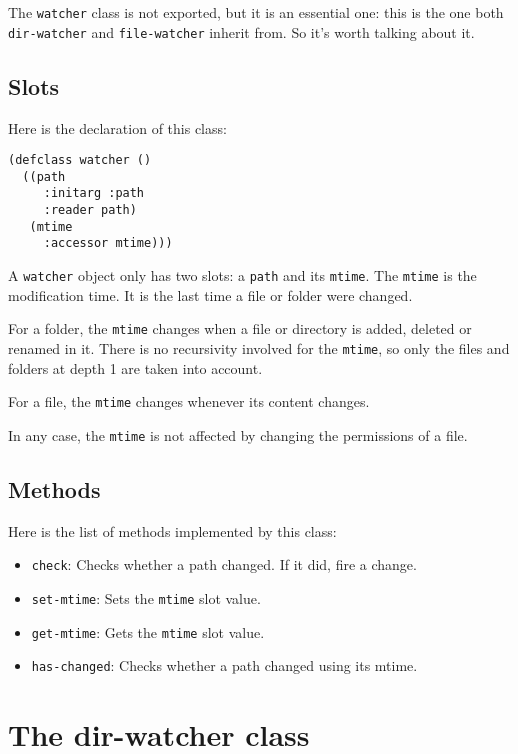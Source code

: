 \documentclass[a4paper]{report}
\newcommand{\code}{\texttt}
\begin{document}
The \code{watcher} class is not exported, but it is an essential one: this is
the one both \code{dir-watcher} and \code{file-watcher} inherit from. So it's
worth talking about it.

\subsection{Slots}

Here is the declaration of this class:

\begin{verbatim}
(defclass watcher ()
  ((path
     :initarg :path
     :reader path)
   (mtime
     :accessor mtime)))
\end{verbatim}

A \code{watcher} object only has two slots: a \code{path} and its \code{mtime}.
The \code{mtime} is the modification time. It is the last time a file or folder
were changed.

For a folder, the \code{mtime} changes when a file or directory is added,
deleted or renamed in it. There is no recursivity involved for the \code{mtime},
so only the files and folders at depth 1 are taken into account.

For a file, the \code{mtime} changes whenever its content changes.

In any case, the \code{mtime} is not affected by changing the permissions of a
file.

\subsection{Methods}

Here is the list of methods implemented by this class:

\begin{itemize}
    \item \code{check}: Checks whether a path changed. If it did, fire a change.
    \item \code{set-mtime}: Sets the \code{mtime} slot value.
    \item \code{get-mtime}: Gets the \code{mtime} slot value.
    \item \code{has-changed}: Checks whether a path changed using its mtime.
\end{itemize}

\section{The dir-watcher class}
\end{document}
